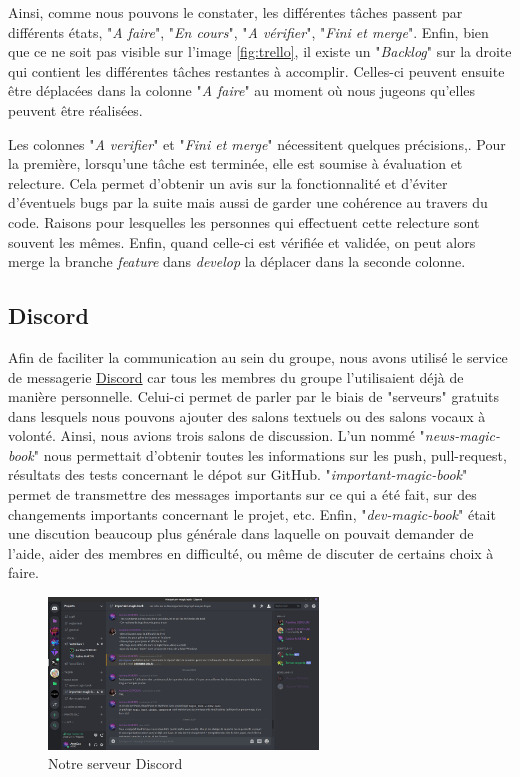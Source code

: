			Ainsi, comme nous pouvons le constater, les différentes tâches passent par différents états, "\textit{A faire}", "\textit{En cours}", "\textit{A vérifier}", "\textit{Fini et merge}". Enfin, bien que ce ne soit pas visible sur l'image \ref{fig:trello}, il existe un "\textit{Backlog}" sur la droite qui contient les différentes tâches restantes à accomplir. Celles-ci peuvent ensuite être déplacées dans la colonne "\textit{A faire}" au moment où nous jugeons qu'elles peuvent être réalisées.

			Les colonnes "\textit{A verifier}" et "\textit{Fini et merge}" nécessitent quelques précisions,. Pour la première, lorsqu'une tâche est terminée, elle est soumise à évaluation et relecture. Cela permet d'obtenir un avis sur la fonctionnalité et d'éviter d'éventuels bugs par la suite mais aussi de garder une cohérence au travers du code. Raisons pour lesquelles les personnes qui effectuent cette relecture sont souvent les mêmes. Enfin, quand celle-ci est vérifiée et validée, on peut alors merge la branche \textit{feature} dans \textit{develop} la déplacer dans la seconde colonne.

		\subsection{Discord}

			Afin de faciliter la communication au sein du groupe, nous avons utilisé le service de messagerie \href{https://discordapp.com}{Discord} car tous les membres du groupe l'utilisaient déjà de manière personnelle. Celui-ci permet de parler par le biais de "serveurs" gratuits dans lesquels nous pouvons ajouter des salons textuels ou des salons vocaux à volonté. Ainsi, nous avions trois salons de discussion. L'un nommé "\textit{news-magic-book}" nous permettait d'obtenir toutes les informations sur les push, pull-request, résultats des tests concernant le dépot sur GitHub. "\textit{important-magic-book}" permet de transmettre des messages importants sur ce qui a été fait, sur des changements importants concernant le projet, etc. Enfin, "\textit{dev-magic-book}" était une discution beaucoup plus générale dans laquelle on pouvait demander de l'aide, aider des membres en difficulté, ou même de discuter de certains choix à faire.

			\begin{figure}[H]
				\centering\includegraphics[width=0.64\textwidth, keepaspectratio]{img/discord.png}
				\caption{Notre serveur Discord}
			\end{figure}
